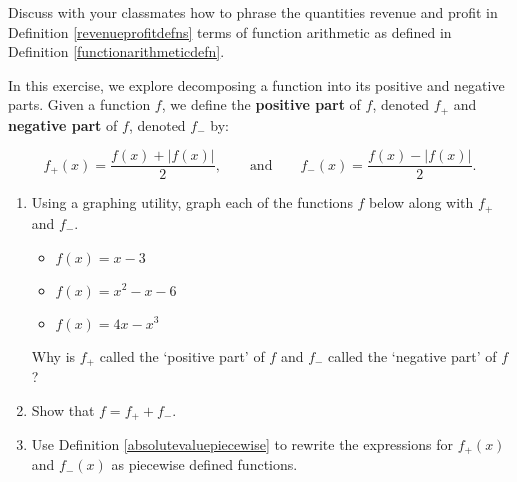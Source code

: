 \documentclass{ximera}
\begin{document}
\begin{problem}
Discuss with your classmates how to phrase the quantities revenue and profit in Definition \ref{revenueprofitdefns} terms of function arithmetic as defined in Definition \ref{functionarithmeticdefn}.
\end{problem}


\begin{problem}\label{posnegdecompexercise}  
In this exercise, we explore decomposing a function into its positive and negative parts.  Given a function $f$, we define the \textbf{positive part} of $f$, denoted $f_{+}$ and \textbf{negative part} of $f$, denoted $f_{-}$ by:

\[ f_{+}(x) = \dfrac{f(x) + |f(x)|}{2}, \qquad \text{and} \qquad f_{-}(x) = \dfrac{f(x) - |f(x)|}{2}. \]

\begin{enumerate}

\item Using a graphing utility, graph each of the functions $f$ below along with $f_{+}$ and $f_{-}$.


\begin{itemize}

\item  $f(x) = x-3$

\item  $f(x) = x^2-x-6$

\item  $f(x) = 4x-x^3$

\end{itemize}


Why is $f_{+}$ called the `positive part' of $f$ and $f_{-}$ called the `negative part' of $f$?

\item Show that $f = f_{+} + f_{-}$.

\item Use Definition \ref{absolutevaluepiecewise} to rewrite the expressions for $f_{+}(x)$ and $f_{-}(x)$ as piecewise defined functions.

\end{enumerate}  
\end{problem} 
\end{document}

